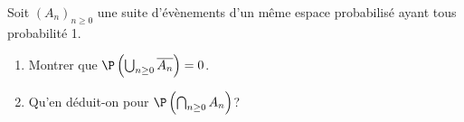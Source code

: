 \documentclass[a4paper,10pt]{report}
\begin{document}
\begin{Exercice}{} Soit $(A_n)_{n \geq 0}$ une suite d'évènements d'un même espace probabilisé ayant tous probabilité 1. 
 
 \begin{enumerate}
 \item Montrer que $\P \left( \bigcup_{n \geq 0} \overline{A_n} \right) = 0$.
 \item Qu'en déduit-on pour $\P \left( \bigcap_{n \geq 0} A_n \right)$?
 \end{enumerate}
 \end{Exercice}
 
\end{document}
